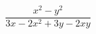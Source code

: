 \begin{ex}[type=expression]
	\begin{condition}
		\(\dfrac{x^2-y^2}{3x-2x^2+3y-2xy}\)
	\end{condition}
\end{ex}